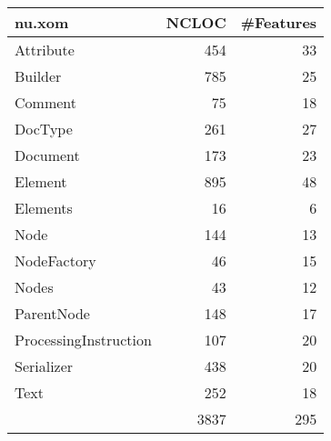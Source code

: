 \begin{tabular}{|l|r|r|}\hline
nu.xom & NCLOC & \#Features\\\hline\hline
Attribute & 454 & 33\\\hline
Builder & 785 & 25\\\hline
Comment & 75 & 18\\\hline
DocType & 261 & 27\\\hline
Document & 173 & 23\\\hline
Element & 895 & 48\\\hline
Elements & 16 & 6\\\hline
Node & 144 & 13\\\hline
NodeFactory & 46 & 15\\\hline
Nodes & 43 & 12\\\hline
ParentNode & 148 & 17\\\hline
ProcessingInstruction & 107 & 20\\\hline
Serializer & 438 & 20\\\hline
Text & 252 & 18\\\hline
\hline
 & 3837 & 295\\\hline
\end{tabular}
